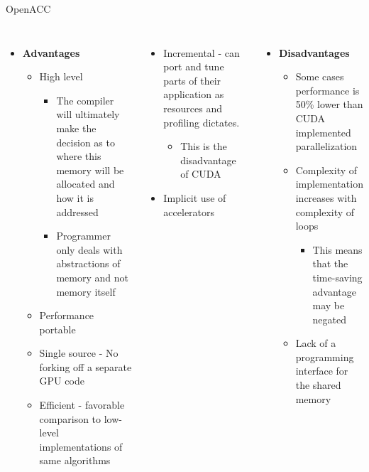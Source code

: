 \documentclass[aspectratio=169]{beamer}
\begin{document}
\begin{frame}[fragile]{OpenACC}
\begin{columns}
\begin{itemize}
\item \textbf{Advantages}
	\begin{itemize}
	\item High level
    \begin{itemize}
    \item The compiler will ultimately make the decision as to where this memory will be allocated and how it is addressed
    \item Programmer only deals with abstractions of memory and not memory itself
    \end{itemize}
    \item Performance portable
    \item Single source - No forking off a separate GPU code
    \item Efficient -  favorable comparison to low-level implementations of same algorithms
	\end{itemize}
\end{itemize}

\begin{itemize}
\item Incremental - can port and tune parts of their application as resources and profiling dictates.
 \begin{itemize}
    \item This is the disadvantage of CUDA
    \end{itemize}
    \item Implicit use of accelerators
   
\end{itemize}
 
\begin{itemize}
\item \textbf{Disadvantages}
\begin{itemize}
\item Some cases performance is 50\% lower than  CUDA implemented parallelization 
\item Complexity of implementation increases with complexity of loops
\begin{itemize}
\item This means that the time-saving advantage may be negated
\end{itemize}
\item Lack of a programming interface for the shared memory
\end{itemize}
\end{itemize}

\end{columns}
\end{frame}
\end{document}
